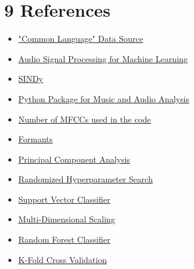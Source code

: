 \documentclass{article}
\begin{document}
\section*{9 \space References}
\begin{itemize}
    \item \href{https://huggingface.co/datasets/common_language}{"Common Language" Data Source}

    \item \href{https://www.youtube.com/playlist?list=PL-wATfeyAMNqIee7cH3q1bh4QJFAaeNv0}{Audio Signal Processing for Machine Learning}

    \item \href{https://www.youtube.com/playlist?list=PLkjmwL-pF6dzj5aSN2sa4ZNm92G9b4ca2}{SINDy}
    
    \item \href{https://librosa.org/doc/latest/index.html}{Python Package for Music and Audio Analysis}

    \item \href{https://ietresearch.onlinelibrary.wiley.com/doi/full/10.1049/tje2.12082#:~:text=All\%20performance\%20metrics\%20gave\%20the,studies\%20use\%20only\%2013\%20MFCCs}{Number of MFCCs used in the code}

    \item \href{https://corpus.eduhk.hk/english_pronunciation/index.php/2-2-formants-of-vowels/}{Formants}
    
    \item \href{https://scikit-learn.org/stable/modules/generated/sklearn.decomposition.PCA.html}{Principal Component Analysis}
    
    \item \href{https://scikit-learn.org/stable/modules/generated/sklearn.model_selection.RandomizedSearchCV.html}{Randomized Hyperparameter Search}

    \item \href{https://scikit-learn.org/stable/modules/generated/sklearn.svm.SVC.html}{Support Vector Classifier}
    
    \item \href{https://scikit-learn.org/stable/modules/manifold.html#multi-dimensional-scaling-mds}{Multi-Dimensional Scaling}
    
    \item \href{https://scikit-learn.org/stable/modules/generated/sklearn.ensemble.RandomForestClassifier.html}{Random Forest Classifier}

    \item \href{https://scikit-learn.org/stable/modules/generated/sklearn.model_selection.StratifiedKFold.html}{K-Fold Cross Validation}
    

\end{itemize}
\end{document}
